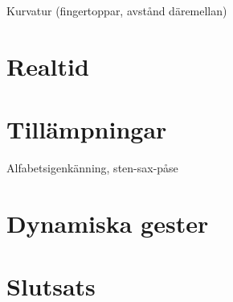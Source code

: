 \documentclass[../rapport_MVEX01-11-05]{subfiles}
\begin{document}
Kurvatur (fingertoppar, avstånd däremellan)

\section{Realtid}
\section{Tillämpningar}
Alfabetsigenkänning, sten-sax-påse

\section{Dynamiska gester}





\section{Slutsats}
\end{document}
